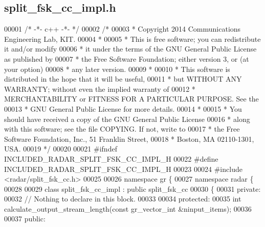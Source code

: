 \subsection{split\+\_\+fsk\+\_\+cc\+\_\+impl.\+h}
\label{split__fsk__cc__impl_8h_source}

\begin{DoxyCode}
00001 \textcolor{comment}{/* -*- c++ -*- */}
00002 \textcolor{comment}{/* }
00003 \textcolor{comment}{ * Copyright 2014 Communications Engineering Lab, KIT.}
00004 \textcolor{comment}{ * }
00005 \textcolor{comment}{ * This is free software; you can redistribute it and/or modify}
00006 \textcolor{comment}{ * it under the terms of the GNU General Public License as published by}
00007 \textcolor{comment}{ * the Free Software Foundation; either version 3, or (at your option)}
00008 \textcolor{comment}{ * any later version.}
00009 \textcolor{comment}{ * }
00010 \textcolor{comment}{ * This software is distributed in the hope that it will be useful,}
00011 \textcolor{comment}{ * but WITHOUT ANY WARRANTY; without even the implied warranty of}
00012 \textcolor{comment}{ * MERCHANTABILITY or FITNESS FOR A PARTICULAR PURPOSE.  See the}
00013 \textcolor{comment}{ * GNU General Public License for more details.}
00014 \textcolor{comment}{ * }
00015 \textcolor{comment}{ * You should have received a copy of the GNU General Public License}
00016 \textcolor{comment}{ * along with this software; see the file COPYING.  If not, write to}
00017 \textcolor{comment}{ * the Free Software Foundation, Inc., 51 Franklin Street,}
00018 \textcolor{comment}{ * Boston, MA 02110-1301, USA.}
00019 \textcolor{comment}{ */}
00020  
00021 \textcolor{preprocessor}{#ifndef INCLUDED\_RADAR\_SPLIT\_FSK\_CC\_IMPL\_H}
00022 \textcolor{preprocessor}{#define INCLUDED\_RADAR\_SPLIT\_FSK\_CC\_IMPL\_H}
00023 
00024 \textcolor{preprocessor}{#include <radar/split_fsk_cc.h>}
00025 
00026 \textcolor{keyword}{namespace }gr \{
00027   \textcolor{keyword}{namespace }radar \{
00028 
00029     \textcolor{keyword}{class }split_fsk_cc_impl : \textcolor{keyword}{public} split_fsk_cc
00030     \{
00031      \textcolor{keyword}{private}:
00032       \textcolor{comment}{// Nothing to declare in this block.}
00033 
00034      \textcolor{keyword}{protected}:
00035       \textcolor{keywordtype}{int} calculate_output_stream_length(\textcolor{keyword}{const} gr\_vector\_int &ninput\_items);
00036 
00037      \textcolor{keyword}{public}:

\end{DoxyCode}
